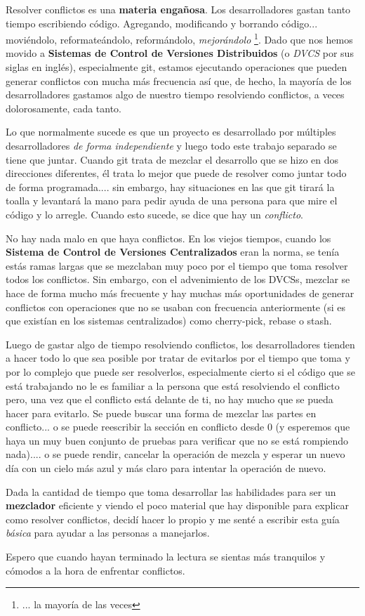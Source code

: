 Resolver conflictos es una {\bf materia engañosa}. Los desarrolladores gastan tanto tiempo escribiendo código.
Agregando, modificando y borrando código... moviéndolo, reformateándolo, reformándolo, {\it mejorándolo}
\footnote{... la mayoría de las veces}. Dado que nos hemos movido a {\bf Sistemas de Control de Versiones Distribuidos}
(o {\it DVCS} por sus siglas en inglés), especialmente git, estamos ejecutando operaciones que pueden generar conflictos
con mucha más frecuencia así que, de hecho, la mayoría de los desarrolladores gastamos algo de nuestro tiempo resolviendo
conflictos, a veces dolorosamente, cada tanto.

Lo que normalmente sucede es que un proyecto es desarrollado por múltiples desarrolladores {\it de forma independiente}
y luego todo este trabajo separado se tiene que juntar. Cuando git trata de mezclar el desarrollo que se hizo en dos direcciones
diferentes, él trata lo mejor que puede de resolver como juntar todo de forma programada.... sin embargo, hay situaciones en las que
git tirará la toalla y levantará la mano para pedir ayuda de una persona para que mire el código y lo arregle. Cuando esto
sucede, se dice que hay un {\it conflicto}.

No hay nada malo en que haya conflictos. En los viejos tiempos, cuando los {\bf Sistema de Control de Versiones Centralizados} eran la
norma, se tenía estás ramas largas que se mezclaban muy poco por el tiempo que toma resolver todos los conflictos. Sin embargo, con el
advenimiento de los DVCSs, mezclar se hace de forma mucho más frecuente y hay muchas más oportunidades de generar conflictos con
operaciones que no se usaban con frecuencia anteriormente (si es que existían en los sistemas centralizados) como cherry-pick,
rebase o stash.

Luego de gastar algo de tiempo resolviendo conflictos, los desarrolladores tienden a hacer todo lo que sea posible por tratar de
evitarlos por el tiempo que toma y por lo complejo que puede ser resolverlos, especialmente cierto si el código que se está
trabajando no le es familiar a la persona que está resolviendo el conflicto pero, una vez que el conflicto está delante de
ti, no hay mucho que se pueda hacer para evitarlo. Se puede buscar una forma de mezclar las partes en conflicto... o se puede
reescribir la sección en conflicto desde 0 (y esperemos que haya un muy buen conjunto de pruebas para verificar que no se está rompiendo
nada).... o se puede rendir, cancelar la operación de mezcla y esperar un nuevo día con un cielo más azul y más claro para intentar
la operación de nuevo.

Dada la cantidad de tiempo que toma desarrollar las habilidades para ser un {\bf mezclador} eficiente y viendo el poco material
que hay disponible para explicar como resolver conflictos, decidí hacer lo propio y me senté a escribir esta guía
{\it básica} para ayudar a las personas a manejarlos.

Espero que cuando hayan terminado la lectura se sientas más tranquilos y cómodos a la hora de enfrentar conflictos.


